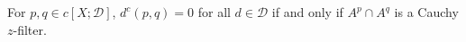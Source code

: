 For $p, q \in c[X; \mathcal{D}]$, $d^c(p, q) = 0$ for all $d \in \mathcal{D}$ if and only if $A^p \cap A^q$ is a Cauchy $z$-filter.
